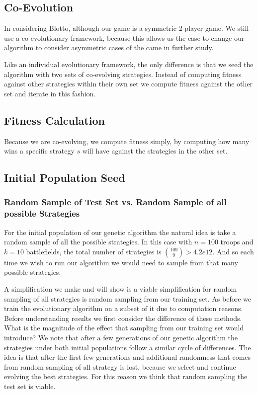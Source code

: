 \documentclass[12pt,letter]{article}
\begin{document}
\subsection{Co-Evolution}
In considering Blotto, although our game is a symmetric 2-player game. We still use a co-evolutionary framework, because this allows us the ease to change our algorithm to consider asymmetric cases of the came in further study.

Like an individual evolutionary framework, the only difference is that we seed the algorithm with two sets of co-evolving strategies. Instead of computing fitness against other strategies within their own set we compute fitness against the other set and iterate in this fashion.

\subsection{Fitness Calculation}
Because we are co-evolving, we compute fitness simply, by computing how many wins a specific strategy $s$ will have against the strategies in the other set.

\subsection{Initial Population Seed} %
\subsubsection{Random Sample of Test Set vs. Random Sample of all possible Strategies}

For the initial population of our genetic algorithm the natural idea is take a random sample of all the possible strategies. In this case with $n = 100$ troops and $k = 10$ battlefields, the total number of strategies is $\binom{109}{9} > 4.2e12$. And so each time we wish to run our algorithm we would need to sample from that many possible strategies.

A simplification we make and will show is a viable simplification for random sampling of all strategies is random sampling from our training set. As before we train the evolutionary algorithm on a subset of it due to computation reasons. Before understanding results we first consider the difference of these methods. What is the magnitude of the effect that sampling from our training set would introduce? We note that after a few generations of our genetic algorithm the strategies under both initial populations follow a similar cycle of differences. The idea is that after the first few generations and additional randomness that comes from random sampling of all strategy is lost, because we select and continue evolving the best strategies. For this reason we think that random sampling the test set is viable.
\end{document}

